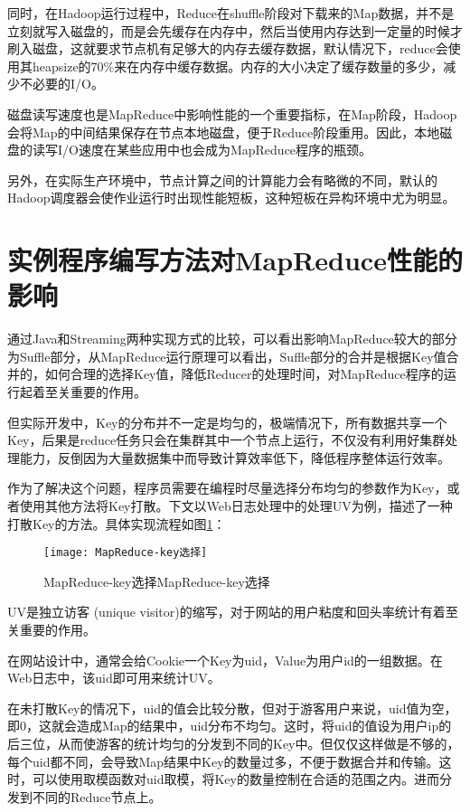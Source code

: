 同时，在Hadoop运行过程中，Reduce在shuffle阶段对下载来的Map数据，并不是立刻就写入磁盘的，而是会先缓存在内存中，然后当使用内存达到一定量的时候才刷入磁盘，这就要求节点机有足够大的内存去缓存数据，默认情况下，reduce会使用其heapsize的70\%来在内存中缓存数据。内存的大小决定了缓存数量的多少，减少不必要的I/O。

磁盘读写速度也是MapReduce中影响性能的一个重要指标，在Map阶段，Hadoop会将Map的中间结果保存在节点本地磁盘，便于Reduce阶段重用。因此，本地磁盘的读写I/O速度在某些应用中也会成为MapReduce程序的瓶颈。

另外，在实际生产环境中，节点计算之间的计算能力会有略微的不同，默认的Hadoop调度器会使作业运行时出现性能短板，这种短板在异构环境中尤为明显。

\section{实例程序编写方法对MapReduce性能的影响}
通过Java和Streaming两种实现方式的比较，可以看出影响MapReduce较大的部分为Suffle部分，从MapReduce运行原理可以看出，Suffle部分的合并是根据Key值合并的，如何合理的选择Key值，降低Reducer的处理时间，对MapReduce程序的运行起着至关重要的作用。

但实际开发中，Key的分布并不一定是均匀的，极端情况下，所有数据共享一个Key，后果是reduce任务只会在集群其中一个节点上运行，不仅没有利用好集群处理能力，反倒因为大量数据集中而导致计算效率低下，降低程序整体运行效率。

作为了解决这个问题，程序员需要在编程时尽量选择分布均匀的参数作为Key，或者使用其他方法将Key打散。下文以Web日志处理中的处理UV为例，描述了一种打散Key的方法。具体实现流程如图\ref{fig:MapReduce-key选择}：

\begin{figure}[!h]
 \centering
 \texttt{[image: MapReduce-key选择]}
 \caption{MapReduce-key选择MapReduce-key选择}
 \label{fig:MapReduce-key选择}
\end{figure}

UV是独立访客 (unique visitor)的缩写，对于网站的用户粘度和回头率统计有着至关重要的作用。

在网站设计中，通常会给Cookie一个Key为uid，Value为用户id的一组数据。在Web日志中，该uid即可用来统计UV。

在未打散Key的情况下，uid的值会比较分散，但对于游客用户来说，uid值为空，即0，这就会造成Map的结果中，uid分布不均匀。这时，将uid的值设为用户ip的后三位，从而使游客的统计均匀的分发到不同的Key中。但仅仅这样做是不够的，每个uid都不同，会导致Map结果中Key的数量过多，不便于数据合并和传输。这时，可以使用取模函数对uid取模，将Key的数量控制在合适的范围之内。进而分发到不同的Reduce节点上。

